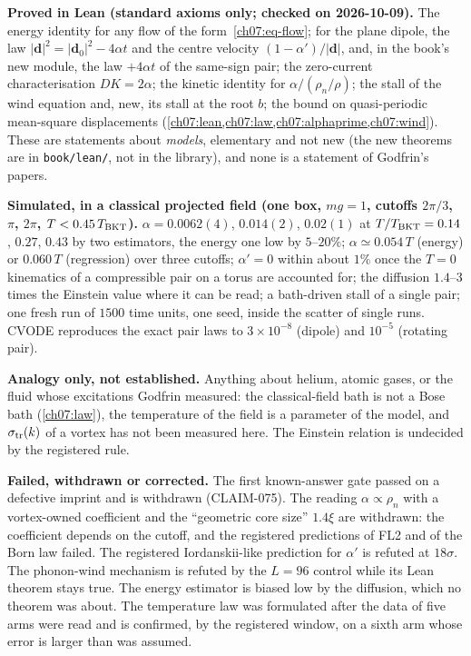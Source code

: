 \begin{honestbox}
\textbf{Proved in Lean (standard axioms only; checked on 2026-10-09).} The energy identity for any flow of the form~\eqref{ch07:eq-flow}; for the plane dipole, the law $|\mathbf d|^2=|\mathbf d_0|^2-4\alpha t$ and the centre velocity $(1-\alpha')/|\mathbf d|$, and, in the book's new module, the law $+4\alpha t$ of the same-sign pair; the zero-current characterisation $DK=2\alpha$; the kinetic identity for $\alpha/(\rho_n/\rho)$; the stall of the wind equation and, new, its stall at the root $b$; the bound on quasi-periodic mean-square displacements (\cref{ch07:lean,ch07:law,ch07:alphaprime,ch07:wind}). These are statements about \emph{models}, elementary and not new (the new theorems are in \texttt{book/lean/}, not in the library), and none is a statement of Godfrin's papers.

\textbf{Simulated, in a classical projected field (one box, $mg=1$, cutoffs $2\pi/3$, $\pi$, $2\pi$, $T<0.45\,T_{\rm BKT}$).} $\alpha=0.0062(4)$, $0.014(2)$, $0.02(1)$ at $T/T_{\rm BKT}=0.14$, $0.27$, $0.43$ by two estimators, the energy one low by $5$--$20\%$; $\alpha\simeq0.054\,T$ (energy) or $0.060\,T$ (regression) over three cutoffs; $\alpha'=0$ within about $1\%$ once the $T=0$ kinematics of a compressible pair on a torus are
accounted for; the diffusion $1.4$--$3$ times the Einstein value where it can be read; a bath-driven stall of a single pair; one fresh run of $1500$ time units, one seed, inside the scatter of single runs. CVODE reproduces the exact pair laws to $3\times10^{-8}$ (dipole) and $10^{-5}$ (rotating pair).

\textbf{Analogy only, not established.} Anything about helium, atomic gases, or the fluid whose excitations Godfrin measured: the classical-field bath is not a Bose bath (\cref{ch07:law}), the temperature of the field is a parameter of the model, and $\sigma_{\rm tr}(k)$ of a vortex has not been measured here. The Einstein relation is undecided by the registered rule.

\textbf{Failed, withdrawn or corrected.} The first known-answer gate passed on a defective imprint and is withdrawn (CLAIM-075). The reading $\alpha\propto\rho_n$ with a vortex-owned coefficient and the ``geometric core size'' $1.4\xi$ are withdrawn: the coefficient depends on the cutoff, and the registered predictions of FL2 and of the Born law failed. The registered Iordanskii-like prediction for $\alpha'$ is refuted at $18\sigma$. The phonon-wind mechanism is
refuted by the $L=96$ control while its Lean theorem stays true. The energy estimator is biased low by the diffusion, which no theorem was about. The temperature law was formulated after the data of five arms were read and is confirmed, by the registered window, on a sixth arm whose error is larger than was assumed.
\end{honestbox}

